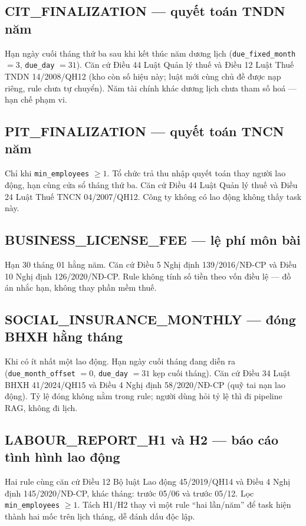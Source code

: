 \subsection{CIT\_FINALIZATION --- quyết toán TNDN năm}

Hạn ngày cuối tháng thứ ba sau khi kết thúc năm dương lịch
(\texttt{due\_fixed\_month} $= 3$, \texttt{due\_day} $= 31$). Căn cứ Điều 44 Luật
Quản lý thuế và Điều 12 Luật Thuế TNDN 14/2008/QH12 (kho còn số hiệu này; luật
mới cùng chủ đề được nạp riêng, rule chưa tự chuyển). Năm tài chính khác dương
lịch chưa tham số hoá --- hạn chế phạm vi.

\subsection{PIT\_FINALIZATION --- quyết toán TNCN năm}

Chỉ khi \texttt{min\_employees} $\ge 1$. Tổ chức trả thu nhập quyết toán thay
người lao động, hạn cùng cửa sổ tháng thứ ba. Căn cứ Điều 44 Luật Quản lý thuế
và Điều 24 Luật Thuế TNCN 04/2007/QH12. Công ty không có lao động không thấy
task này.

\subsection{BUSINESS\_LICENSE\_FEE --- lệ phí môn bài}

Hạn 30 tháng 01 hằng năm. Căn cứ Điều 5 Nghị định 139/2016/NĐ-CP và Điều 10
Nghị định 126/2020/NĐ-CP. Rule không tính số tiền theo vốn điều lệ --- đồ án
nhắc hạn, không thay phần mềm thuế.

\subsection{SOCIAL\_INSURANCE\_MONTHLY --- đóng BHXH hằng tháng}

Khi có ít nhất một lao động. Hạn ngày cuối tháng đang diễn ra
(\texttt{due\_month\_offset} $= 0$, \texttt{due\_day} $= 31$ kẹp cuối tháng).
Căn cứ Điều 34 Luật BHXH 41/2024/QH15 và Điều 4 Nghị định 58/2020/NĐ-CP (quỹ
tai nạn lao động). Tỷ lệ đóng không nằm trong rule; người dùng hỏi tỷ lệ thì
đi pipeline RAG, không đi lịch.

\subsection{LABOUR\_REPORT\_H1 và H2 --- báo cáo tình hình lao động}

Hai rule cùng căn cứ Điều 12 Bộ luật Lao động 45/2019/QH14 và Điều 4 Nghị định
145/2020/NĐ-CP, khác tháng: trước 05/06 và trước 05/12. Lọc
\texttt{min\_employees} $\ge 1$. Tách H1/H2 thay vì một rule ``hai lần/năm''
để task hiện thành hai mốc trên lịch tháng, dễ đánh dấu độc lập.

